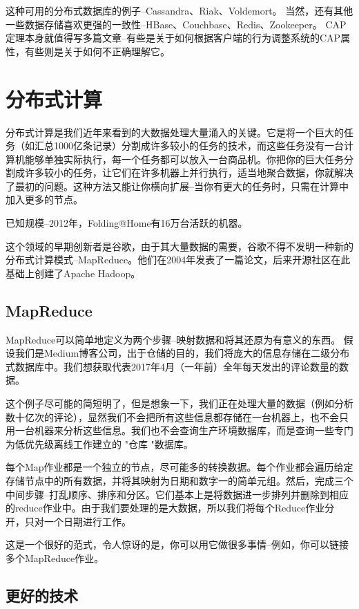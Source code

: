\documentclass[degree=project,degree-type=project,cjk-font=noto]{thuthesis}
\begin{document}
这种可用的分布式数据库的例子--Cassandra、Riak、Voldemort。
当然，还有其他一些数据存储喜欢更强的一致性--HBase、Couchbase、Redis、Zookeeper。
CAP定理本身就值得写多篇文章--有些是关于如何根据客户端的行为调整系统的CAP属性，有些则是关于如何不正确理解它。

\chapter{分布式计算}

分布式计算是我们近年来看到的大数据处理大量涌入的关键。它是将一个巨大的任务（如汇总1000亿条记录）分割成许多较小的任务的技术，而这些任务没有一台计算机能够单独实际执行，每一个任务都可以放入一台商品机。你把你的巨大任务分割成许多较小的任务，让它们在许多机器上并行执行，适当地聚合数据，你就解决了最初的问题。这种方法又能让你横向扩展--当你有更大的任务时，只需在计算中加入更多的节点。

已知规模--2012年，Folding@Home有16万台活跃的机器。

这个领域的早期创新者是谷歌，由于其大量数据的需要，谷歌不得不发明一种新的分布式计算模式--MapReduce。他们在2004年发表了一篇论文，后来开源社区在此基础上创建了Apache Hadoop。

\section{MapReduce}

MapReduce可以简单地定义为两个步骤--映射数据和将其还原为有意义的东西。
假设我们是Medium博客公司，出于仓储的目的，我们将庞大的信息存储在二级分布式数据库中。我们想获取代表2017年4月（一年前）全年每天发出的评论数量的数据。

这个例子尽可能的简短明了，但是想象一下，我们正在处理大量的数据（例如分析数十亿次的评论），显然我们不会把所有这些信息都存储在一台机器上，也不会只用一台机器来分析这些信息。我们也不会查询生产环境数据库，而是查询一些专门为低优先级离线工作建立的 "仓库 "数据库。

每个Map作业都是一个独立的节点，尽可能多的转换数据。每个作业都会遍历给定存储节点中的所有数据，并将其映射为日期和数字一的简单元组。然后，完成三个中间步骤--打乱顺序、排序和分区。它们基本上是将数据进一步排列并删除到相应的reduce作业中。由于我们要处理的是大数据，所以我们将每个Reduce作业分开，只对一个日期进行工作。

这是一个很好的范式，令人惊讶的是，你可以用它做很多事情--例如，你可以链接多个MapReduce作业。

\section{更好的技术}
\end{document}
